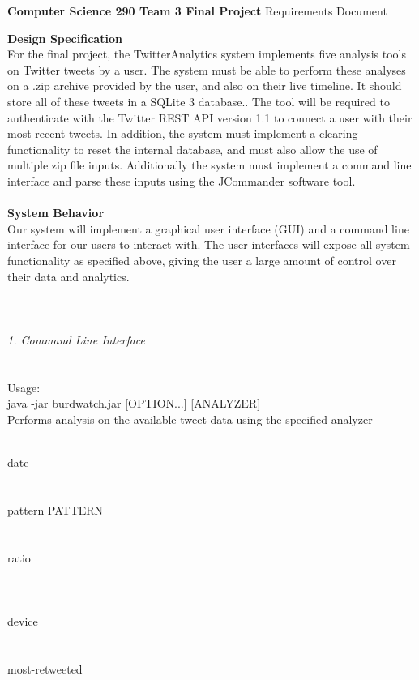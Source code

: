 \documentclass{article}
\begin{document}
\begin{center}
\textbf{Computer Science 290 Team 3 Final Project}
Requirements Document
\end{center}
\noindent
\textbf{\Large Design Specification}
\\
For the final project, the TwitterAnalytics system implements five analysis tools on Twitter tweets by a user. The system must be able to perform these analyses on a .zip archive provided by the user, and also on their live timeline. It should store all of these tweets in a SQLite 3 database.. The tool will be required to authenticate with the Twitter REST API version 1.1 to connect a user with their most recent tweets. In addition, the system must implement a clearing functionality to reset the internal database, and must also allow the use of multiple zip file inputs.
Additionally the system must implement a command line interface and parse these inputs using the JCommander software tool.
\\
\\
\noindent
\textbf{\Large System Behavior}
\\
Our system will implement a graphical user interface (GUI) and a command line interface for our users to interact with. The user interfaces will expose all system functionality as specified above, giving the user a large amount of control over their data and analytics.
\\
\\
\\
\\
\textit{\Large 1. Command Line Interface}
\\
\\
\\
Usage:
\\
java -jar burdwatch.jar [OPTION...] [ANALYZER]
\\
Performs analysis on the available tweet data using the specified analyzer
\\
\\
\parbox[t][3cm][t]{7cm}{\normalsize date\\
\\
\\
pattern PATTERN\\
\\
\\
ratio
\\
\\
\\
\\
device
\\
\\
\\
most-retweeted} 
\end{document}
